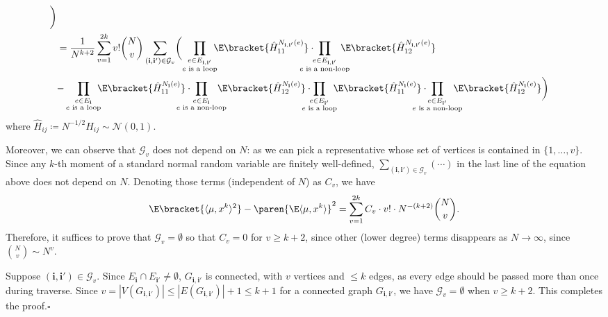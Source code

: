 \documentclass{homework}
\begin{document}
{\begin{align*}
        \biggr)
    \\ &= \frac 1 {N^{k + 2}} \sum_{v=1}^{2k} v!\binom N v \sum_{(\mathbf i,\mathbf i') \in \mathcal G_v} \biggl(
        \prod_{\substack{e\in E_{\mathbf i,\mathbf i'} \\ \text{$e$ is a loop}}}\mkern-10mu \E\bracket{ \hat H_{11}^{N_{\mathbf i,\mathbf i'} (e)} }\cdot \mkern-30mu\prod_{\substack{e\in E_{\mathbf i,\mathbf i'} \\ \text{$e$ is a non-loop}}} \mkern-20mu\E\bracket{ \hat H_{12}^{N_{\mathbf i,\mathbf i'} (e)} } \biggr.
        \\&\biggl. - 
        \prod_{\substack{e\in E_{\mathbf i} \\ \text{$e$ is a loop}}} \mkern-10mu\E\bracket{ \hat H_{11}^{N_{\mathbf i} (e)} }\cdot \mkern-30mu\prod_{\substack{e\in E_{\mathbf i} \\ \text{$e$ is a non-loop}}} \mkern-20mu\E\bracket{ \hat H_{12}^{N_{\mathbf i} (e)} }\cdot \mkern-20mu
        \prod_{\substack{e\in E_{\mathbf i'} \\ \text{$e$ is a loop}}}\mkern-10mu \E\bracket{ \hat H_{11}^{N_{\mathbf i} (e)} }\cdot \mkern-30mu\prod_{\substack{e\in E_{\mathbf i'} \\ \text{$e$ is a non-loop}}} \mkern-20mu\E\bracket{ \hat H_{12}^{N_{\mathbf i} (e)} }
        \biggr)
\end{align*}
where $\hat H_{ij} \coloneqq N^{-1/2}H_{ij}\sim \mathcal N(0,1)$.

Moreover, we can observe that $\mathcal G_v$ does not depend on $N$: as we can pick a representative whose set of vertices is contained in $\{1,\dots,v\}$. Since any $k$-th moment of a standard normal random variable are finitely well-defined, $\sum_{(\mathbf i,\mathbf i')\in \mathcal G_v} (\cdots)$ in the last line of the equation above does not depend on $N$. Denoting those terms (independent of $N$) as $C_v$, we have
$$ \E\bracket{\langle{\mu, x^k}\rangle^2} - \paren{\E\langle{\mu,x^k}\rangle}^2 = \sum_{v=1}^{2k} C_v\cdot v!\cdot N^{-(k+2)}\binom N v. $$
Therefore, it suffices to prove that $\mathcal G_v = \emptyset$ so that $C_v = 0$ for $v\ge k+2$, since other (lower degree) terms disappears as $N\to \infty$, since $\binom N v \sim N^{v}$.

Suppose $(\mathbf i, \mathbf i') \in \mathcal G_v$. Since $E_{\mathbf i} \cap E_{\mathbf i'}\ne\emptyset$, $G_{\mathbf i,\mathbf i'}$ is connected, with $v$ vertices and $\le k$ edges, as every edge should be passed more than once during traverse. Since $v = |V(G_{\mathbf i,\mathbf i'})| \le |E(G_{\mathbf i,\mathbf i'})| + 1 \le k+1$ for a connected graph $G_{\mathbf i,\mathbf i'}$, we have $\mathcal G_v = \emptyset$ when $v \ge k+2$. This completes the proof.\hfill $\square$
}
\end{document}
